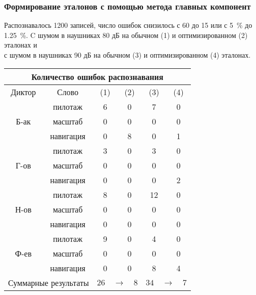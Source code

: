 \begin{frame}
\frametitle{\small Формирование эталонов с помощью метода главных компонент}
\scriptsize
\vfill
Распознавалось 1200 записей, число ошибок снизилось с 60 до 15 или с 5~\% до 1.25~\%.
C шумом в наушниках 80 дБ на обычном (1) и оптимизированном (2) эталонах и \\
с шумом в наушниках 90 дБ на обычном (3) и оптимизированном (4) эталонах.
\footnotesize
\vfill
\begin{table}[h]
	\centering
	\begin{tabular}{| c | c | c | c | c | c |}
		\hline
		\multicolumn{6}{|c|}{Количество ошибок распознавания} \\
		\hline
		Диктор & Слово & \phantom{00} (1) \phantom{00} & \phantom{00} (2) \phantom{00} & \phantom{00} (3) \phantom{00} & \phantom{00} (4) \phantom{00} \\
		\hline
				& пилотаж	& 6 & 0 & 7 & 0 \\
		Б-ак	& масштаб	& 0 & 0 & 0 & 0 \\
				& навигация & 0 & 8 & 0 & 1 \\
		\hline
				& пилотаж	& 3 & 0 & 3 & 0 \\
		Г-ов	& масштаб   & 0 & 0 & 0 & 0 \\
				& навигация & 0 & 0 & 0 & 2 \\
		\hline
				& пилотаж	& 8 & 0 & 12& 0 \\
		Н-ов	& масштаб   & 0 & 0 & 0 & 0 \\
				& навигация & 0 & 0 & 0 & 0 \\
		\hline
				& пилотаж	& 9 & 0 & 4 & 0 \\
		Ф-ев	& масштаб   & 0 & 0 & 0 & 0 \\
				& навигация & 0 & 0 & 8 & 4 \\
		\hline
		\multicolumn{2}{|c|}{Суммарные результаты} & \multicolumn{2}{c|}{$26 \quad\longrightarrow\quad 8$} & \multicolumn{2}{c|}{$34 \quad\longrightarrow\quad 7$} \\
		\hline
	\end{tabular}
\end{table}
\vfill
\end{frame}

